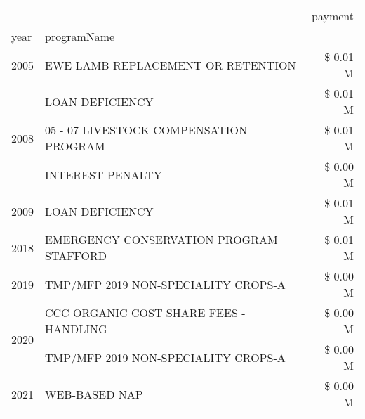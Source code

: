 \begin{tabular}{llr}
\toprule
 &  & payment \\
year & programName &  \\
\midrule
2005 & EWE LAMB REPLACEMENT OR RETENTION & \$ 0.01 M \\
\cline{1-3}
\multirow[t]{3}{*}{2008} & LOAN DEFICIENCY & \$ 0.01 M \\
 & 05 - 07 LIVESTOCK COMPENSATION PROGRAM & \$ 0.01 M \\
 & INTEREST PENALTY & \$ 0.00 M \\
\cline{1-3}
2009 & LOAN DEFICIENCY & \$ 0.01 M \\
\cline{1-3}
2018 & EMERGENCY CONSERVATION PROGRAM STAFFORD & \$ 0.01 M \\
\cline{1-3}
2019 & TMP/MFP 2019 NON-SPECIALITY CROPS-A & \$ 0.00 M \\
\cline{1-3}
\multirow[t]{2}{*}{2020} & CCC ORGANIC COST SHARE FEES - HANDLING & \$ 0.00 M \\
 & TMP/MFP 2019 NON-SPECIALITY CROPS-A & \$ 0.00 M \\
\cline{1-3}
2021 & WEB-BASED NAP & \$ 0.00 M \\
\cline{1-3}
\bottomrule
\end{tabular}
